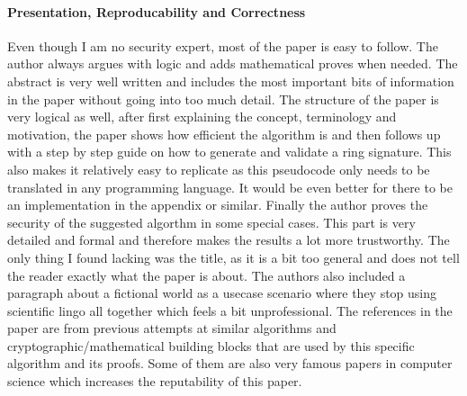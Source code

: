 \documentclass{scrartcl}
\begin{document}
\paragraph{Presentation, Reproducability and Correctness}{
Even though I am no security expert, most of the paper is easy to follow. The author always argues with logic and adds mathematical proves when needed. 
The abstract is very well written and includes the most important bits of information in the paper without going into too much detail. The structure of the paper is very logical as well, after first explaining the concept,  terminology and motivation, the paper shows how efficient the algorithm is and then follows up with a step by step guide on how to generate and validate a ring signature. This also makes it relatively easy to replicate as this pseudocode only needs to be translated in any programming language. It would be even better for there to be an implementation in the appendix or similar. Finally the author proves the security of the suggested algorthm in some special cases. This part is very detailed and formal and therefore makes the results a lot more trustworthy.
The only thing I found lacking was the title, as it is a bit too general and does not tell the reader exactly what the paper is about. 
The authors also included a paragraph about a fictional world as a usecase scenario where they stop using scientific lingo all together which feels a bit  unprofessional.
The references in the paper are from previous attempts at similar algorithms and cryptographic/mathematical building blocks that are used by this specific algorithm and its proofs. Some of them are also very famous papers in computer science which increases the reputability of this paper.
}





\end{document}
